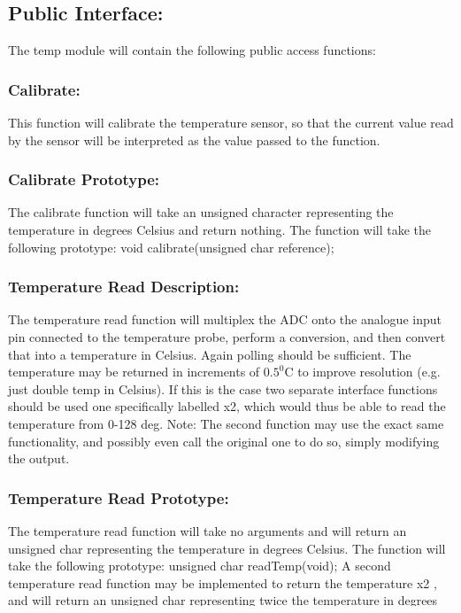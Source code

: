 \documentclass[]{article}
\begin{document}
\subsection{Public Interface:}
The temp module will contain the following public access functions:

\subsubsection{Calibrate:}
This function will calibrate the temperature sensor, so that the current value read by the sensor will be interpreted as the value passed to the function.

\subsubsection{Calibrate Prototype:}
The calibrate function will take an unsigned character representing the temperature in degrees Celsius and return nothing. The function will take the following prototype: \newline \newline
void calibrate(unsigned char reference);

\subsubsection{Temperature Read Description:}
The temperature read function will multiplex the ADC onto the analogue input pin connected to the temperature probe, perform a conversion, and then convert that into a temperature in Celsius. Again polling should be sufficient. The temperature may be returned in increments of $0.5^0$C to improve resolution (e.g. just double temp in Celsius). If this is the case two separate interface functions should be used one specifically labelled x2, which would thus be able to read the temperature from 0-128 deg. Note: The second function may use the exact same functionality, and possibly even call the original one to do so, simply modifying the output.

\subsubsection{Temperature Read Prototype:}
The temperature read function will take no arguments and will return an unsigned char representing the temperature in degrees Celsius. The function will take the following prototype: \newline \newline
unsigned char readTemp(void);
\newline \newline
A second temperature read function may be implemented to return the temperature x2 , and will return an unsigned char representing twice the temperature in degrees Celsius. The function will take the following prototype: \newline \newline
unsigned char readTempx2(void);
\end{document}
